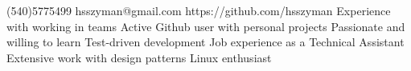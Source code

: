 \documentclass[a4paper]{resume}
\begin{document}
            {(540)5775499}
            {hsszyman@gmail.com}
            {https://github.com/hsszyman}
    		   {Experience with working in teams}
    		   {Active Github user with personal projects}
    		   {Passionate and willing to learn}
    		   {Test-driven development}
    		   {Job experience as a Technical Assistant}
    		   {Extensive work with design patterns}
    		   {Linux enthusiast}
\end{document}
